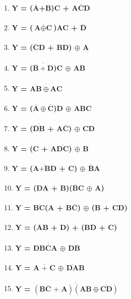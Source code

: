 \documentclass[a4paper, 100pt]{scrartcl}
\begin{document}
	
	1. \textbf{Y = ($\overline{\textbf{A}}$+B)C + $\overline{\textbf{ACD}}$} 
	\\
	\\
	2. \textbf{Y = ($\overline{\textbf{A} \oplus\textbf{C}}$)\textbf{AC} + $\overline{\textbf{D}}$} 
	\\
	\\
	3. \textbf{Y = ($\overline{\textbf{C}}$D + \textbf{BD}) $\oplus$ A}
	\\
	\\
	4. \textbf{Y = ($\overline{\overline{\textbf{B}}+\textbf{D}}$)C $\oplus$ AB}
	\\
	\\
	5. \textbf{Y = $\overline{\overline{\textbf{AB}}\oplus \textbf{AC}}$}
	\\
	\\
	6. \textbf{Y = ($\overline{\textbf{A}}\oplus\overline{\textbf{C}}$)D $\oplus$ ABC}
	\\
	\\
	7. \textbf{Y = ($\overline{\overline{\textbf{D}}\textbf{B}}$ + A$\overline{\textbf{C}}$) $\oplus$ CD}
	\\
	\\
	8. \textbf{Y = (C + A$\overline{\textbf{DC}}$) $\oplus$ B}
	\\
	\\
	9. \textbf{Y = ($\overline{\textbf{A+BD}}$ + C) $\oplus$ $\overline{\textbf{B}}$A}
	\\
	\\
	10. \textbf{Y = (DA + B)($\overline{\textbf{B}}$C $\oplus$ A)}
	\\
	\\
	11. \textbf{Y = $\overline{\textbf{BC}}$(A + B$\overline{\textbf{C}}$) $\oplus$ (B + CD)}
	\\
	\\
	12. \textbf{Y = ($\overline{\textbf{A}}$B + D) + (B$\overline{\textbf{D}}$ + C)}
	\\
	\\
	13. \textbf{Y = D$\overline{\textbf{B}\overline{\textbf{C}}\textbf{A}}$ $\oplus$ DB}
	\\
	\\
	14. \textbf{Y = $\overline{\textbf{A + C}}$ $\oplus$ $\overline{\textbf{DA}}$B}
	\\
	\\
	15. \textbf{Y = $\overline{(\textbf{B}\overline{\textbf{C}}\textbf{ + A}) (\textbf{AB} \oplus \overline{\textbf{CD}})}$}
\end{document}
